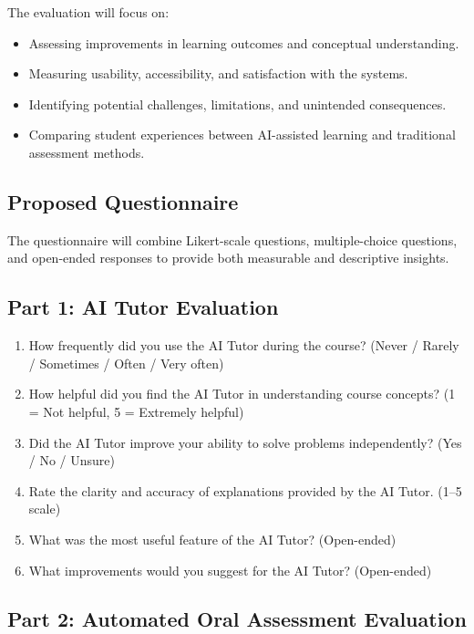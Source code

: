 The evaluation will focus on:
\begin{itemize}
    \item Assessing improvements in learning outcomes and conceptual understanding.
    \item Measuring usability, accessibility, and satisfaction with the systems.
    \item Identifying potential challenges, limitations, and unintended consequences.
    \item Comparing student experiences between AI-assisted learning and traditional assessment methods.
\end{itemize}

\subsection*{Proposed Questionnaire}

The questionnaire will combine Likert-scale questions, multiple-choice questions, and open-ended responses to provide both measurable and descriptive insights.

\subsection{Part 1: AI Tutor Evaluation}
\begin{enumerate}
    \item How frequently did you use the AI Tutor during the course? (Never / Rarely / Sometimes / Often / Very often)
    \item How helpful did you find the AI Tutor in understanding course concepts? (1 = Not helpful, 5 = Extremely helpful)
    \item Did the AI Tutor improve your ability to solve problems independently? (Yes / No / Unsure)
    \item Rate the clarity and accuracy of explanations provided by the AI Tutor. (1–5 scale)
    \item What was the most useful feature of the AI Tutor? (Open-ended)
    \item What improvements would you suggest for the AI Tutor? (Open-ended)
\end{enumerate}

\subsection{Part 2: Automated Oral Assessment Evaluation}

